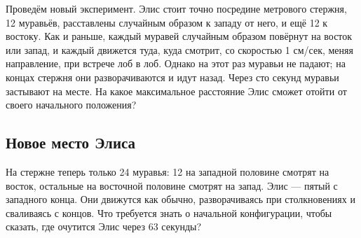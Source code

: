 Проведём новый эксперимент.
Элис стоит точно посредине метрового стержня, 12 муравьёв, расставлены случайным образом к западу от него, и ещё 12 к востоку.
Как и раньше, каждый муравей случайным образом повёрнут на восток или запад, и каждый движется туда, куда смотрит, со скоростью 1 см/сек, меняя направление, при встрече лоб в лоб.
Однако на этот раз муравьи не падают;  
на концах стержня они разворачиваются и идут назад.
Через сто секунд муравьи застывают на месте.
На какое максимальное расстояние Элис сможет отойти от своего начального положения?

\subsection*{Новое место Элиса}

На стержне теперь только 24 муравья:
12 на западной половине смотрят на восток,
остальные на восточной половине смотрят на запад.
Элис --- пятый с западного конца.
Они движутся как обычно, разворачиваясь при столкновениях и сваливаясь с концов.
Что требуется знать о начальной конфигурации, чтобы сказать, где очутится Элис через 63 секунды?

